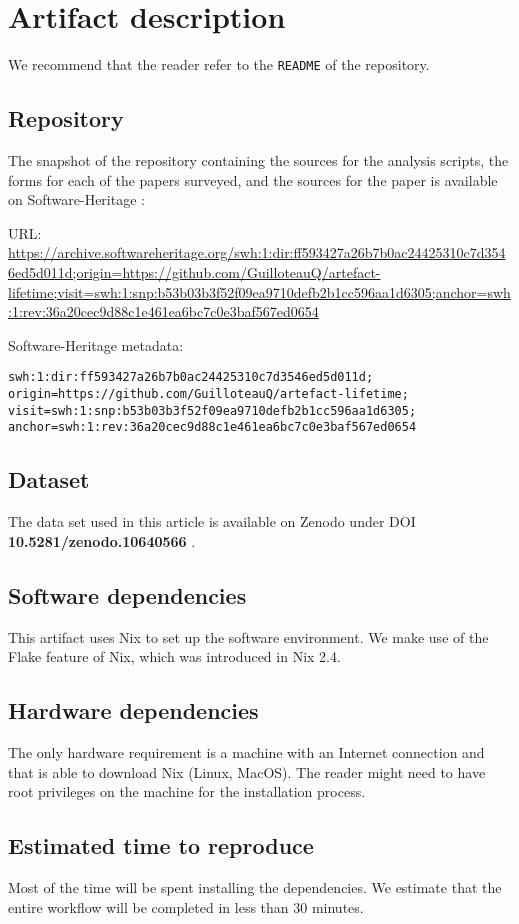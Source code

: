 \documentclass[sigconf,natbib=false]{acmart}
\begin{document}
\newpage

\appendix

\section{Artifact description}

We recommend that the reader refer to the \texttt{README} of the repository.

\subsection{Repository}

The snapshot of the repository containing the sources for the analysis scripts, the forms for each of the papers surveyed, and the sources for the paper is available on Software-Heritage \cite{artefact-lifetime}:

URL: \url{https://archive.softwareheritage.org/swh:1:dir:ff593427a26b7b0ac24425310c7d3546ed5d011d;origin=https://github.com/GuilloteauQ/artefact-lifetime;visit=swh:1:snp:b53b03b3f52f09ea9710defb2b1cc596aa1d6305;anchor=swh:1:rev:36a20cec9d88c1e461ea6bc7c0e3baf567ed0654}


Software-Heritage metadata:

\begin{verbatim}
swh:1:dir:ff593427a26b7b0ac24425310c7d3546ed5d011d;
origin=https://github.com/GuilloteauQ/artefact-lifetime;
visit=swh:1:snp:b53b03b3f52f09ea9710defb2b1cc596aa1d6305;
anchor=swh:1:rev:36a20cec9d88c1e461ea6bc7c0e3baf567ed0654
\end{verbatim}

\subsection{Dataset}

The data set used in this article is available on Zenodo under DOI \textbf{ 10.5281/zenodo.10640566} \cite{guilloteau_2024_10640566}.

\subsection{Software dependencies}

This artifact uses Nix to set up the software environment.
We make use of the Flake feature of Nix, which was introduced in Nix 2.4.

\subsection{Hardware dependencies}

The only hardware requirement is a machine with an Internet connection and that is able to download Nix (Linux, MacOS).
The reader might need to have root privileges on the machine for the installation process.

\subsection{Estimated time to reproduce}

Most of the time will be spent installing the dependencies.
We estimate that the entire workflow will be completed in less than 30 minutes.
\end{document}
